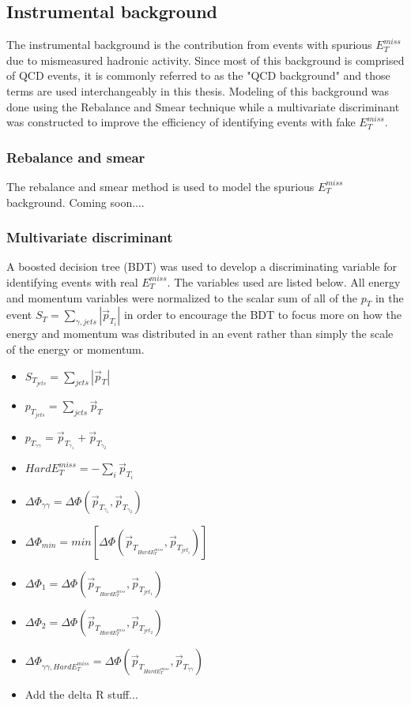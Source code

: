 \subsection{Instrumental background}
The instrumental background is the contribution from events with spurious $E^{miss}_T$ due to mismeasured hadronic activity.  Since most of this background is comprised of QCD events, it is commonly referred to as the "QCD background" and those terms are used interchangeably in this thesis.  Modeling of this background was done using the Rebalance and Smear technique while a multivariate discriminant was constructed to improve the efficiency of identifying events with fake $E^{miss}_T$.

\subsubsection{Rebalance and smear}
The rebalance and smear method is used to model the spurious $E^{miss}_T$ background.  Coming soon....
\subsubsection{Multivariate discriminant}
A boosted decision tree (BDT) was used to develop a discriminating variable for identifying events with real $E^{miss}_T$.  The variables used are listed below.  All energy and momentum variables were normalized to the scalar sum of all of the $p_T$ in the event $S_T = \sum_{\gamma,jets} |\vec{p}_{T_i}|$ in order to encourage the BDT to focus more on how the energy and momentum was distributed in an event rather than simply the scale of the energy or momentum.  

\begin{itemize}
	\item $S_{T_{jets}} = \sum_{jets}|\vec{p}_T|$
	\item $p_{T_{jets}} = \sum_{jets}\vec{p}_T$
	\item $p_{T_{\gamma \gamma}} = \vec{p}_{T_{\gamma_1}} + \vec{p}_{T_{\gamma_2}}$
	\item $HardE_T^{miss} = -\sum_{i}\vec{p}_{T_{i}}$
	\item $\Delta \Phi_{\gamma \gamma} = \Delta \Phi (\vec{p}_{T_{\gamma_1}}, \vec{p}_{T_{\gamma_2}})$
	\item $\Delta \Phi_{min} = min[\Delta \Phi (\vec{p}_{T_{HardE_T^{miss}}}, \vec{p}_{T_{jet_i}})]$
	\item $\Delta \Phi_{1} = \Delta \Phi (\vec{p}_{T_{HardE_T^{miss}}}, \vec{p}_{T_{jet_1}})$
	\item $\Delta \Phi_{2} = \Delta \Phi (\vec{p}_{T_{HardE_T^{miss}}}, \vec{p}_{T_{jet_2}})$
	\item $\Delta \Phi_{\gamma \gamma, HardE_T^{miss}} = \Delta \Phi (\vec{p}_{T_{HardE_T^{miss}}}, \vec{p}_{T_{\gamma \gamma}})$
	\item Add the delta R stuff...
\end{itemize}



